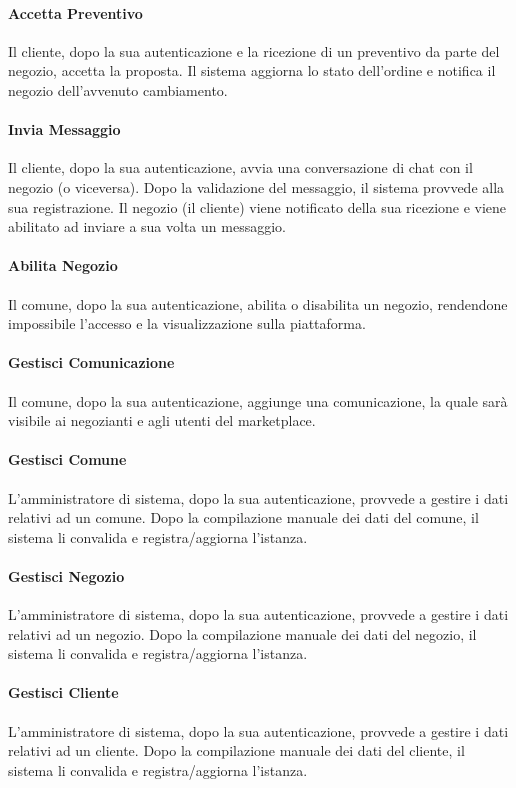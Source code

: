 \paragraph{Accetta Preventivo} Il cliente, dopo la sua autenticazione e la ricezione di un preventivo da parte del negozio, accetta la proposta. Il sistema aggiorna lo stato dell'ordine e notifica il negozio dell'avvenuto cambiamento.
\paragraph{Invia Messaggio} Il cliente, dopo la sua autenticazione, avvia una conversazione di chat con il negozio (o viceversa). Dopo la validazione del messaggio, il sistema provvede alla sua registrazione. Il negozio (il cliente) viene notificato della sua ricezione e viene abilitato ad inviare a sua volta un messaggio.
\paragraph{Abilita Negozio} Il comune, dopo la sua autenticazione, abilita o disabilita un negozio, rendendone impossibile l'accesso e la visualizzazione sulla piattaforma.
\paragraph{Gestisci Comunicazione} Il comune, dopo la sua autenticazione, aggiunge una comunicazione, la quale sarà visibile ai negozianti e agli utenti del marketplace.
\paragraph{Gestisci Comune} L'amministratore di sistema, dopo la sua autenticazione, provvede a gestire i dati relativi ad un comune. Dopo la compilazione manuale dei dati del comune, il sistema li convalida e registra/aggiorna l'istanza. 
\paragraph{Gestisci Negozio} L'amministratore di sistema, dopo la sua autenticazione, provvede a gestire i dati relativi ad un negozio. Dopo la compilazione manuale dei dati del negozio, il sistema li convalida e registra/aggiorna l'istanza. 
\paragraph{Gestisci Cliente} L'amministratore di sistema, dopo la sua autenticazione, provvede a gestire i dati relativi ad un cliente. Dopo la compilazione manuale dei dati del cliente, il sistema li convalida e registra/aggiorna l'istanza.


